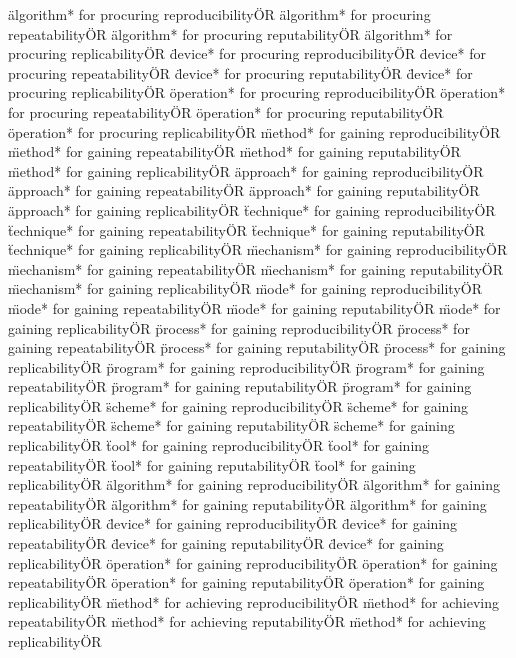 \documentclass[
10pt, %
a4paper, %
oneside, %
headinclude,footinclude, %
BCOR5mm, %
]{scrartcl}
\begin{document}
\"algorithm* for procuring reproducibility\" OR \"algorithm* for procuring repeatability\" OR \"algorithm* for procuring reputability\" OR \"algorithm* for procuring replicability\" OR 
\"device* for procuring reproducibility\" OR \"device* for procuring repeatability\" OR \"device* for procuring reputability\" OR \"device* for procuring replicability\" OR 
\"operation* for procuring reproducibility\" OR \"operation* for procuring repeatability\" OR \"operation* for procuring reputability\" OR \"operation* for procuring replicability\" OR 
\"method* for gaining reproducibility\" OR \"method* for gaining repeatability\" OR \"method* for gaining reputability\" OR \"method* for gaining replicability\" OR 
\"approach* for gaining reproducibility\" OR \"approach* for gaining repeatability\" OR \"approach* for gaining reputability\" OR \"approach* for gaining replicability\" OR 
\"technique* for gaining reproducibility\" OR \"technique* for gaining repeatability\" OR \"technique* for gaining reputability\" OR \"technique* for gaining replicability\" OR 
\"mechanism* for gaining reproducibility\" OR \"mechanism* for gaining repeatability\" OR \"mechanism* for gaining reputability\" OR \"mechanism* for gaining replicability\" OR 
\"mode* for gaining reproducibility\" OR \"mode* for gaining repeatability\" OR \"mode* for gaining reputability\" OR \"mode* for gaining replicability\" OR 
\"process* for gaining reproducibility\" OR \"process* for gaining repeatability\" OR \"process* for gaining reputability\" OR \"process* for gaining replicability\" OR 
\"program* for gaining reproducibility\" OR \"program* for gaining repeatability\" OR \"program* for gaining reputability\" OR \"program* for gaining replicability\" OR 
\"scheme* for gaining reproducibility\" OR \"scheme* for gaining repeatability\" OR \"scheme* for gaining reputability\" OR \"scheme* for gaining replicability\" OR 
\"tool* for gaining reproducibility\" OR \"tool* for gaining repeatability\" OR \"tool* for gaining reputability\" OR \"tool* for gaining replicability\" OR 
\"algorithm* for gaining reproducibility\" OR \"algorithm* for gaining repeatability\" OR \"algorithm* for gaining reputability\" OR \"algorithm* for gaining replicability\" OR 
\"device* for gaining reproducibility\" OR \"device* for gaining repeatability\" OR \"device* for gaining reputability\" OR \"device* for gaining replicability\" OR 
\"operation* for gaining reproducibility\" OR \"operation* for gaining repeatability\" OR \"operation* for gaining reputability\" OR \"operation* for gaining replicability\" OR 
\"method* for achieving reproducibility\" OR \"method* for achieving repeatability\" OR \"method* for achieving reputability\" OR \"method* for achieving replicability\" OR 
\end{document}
